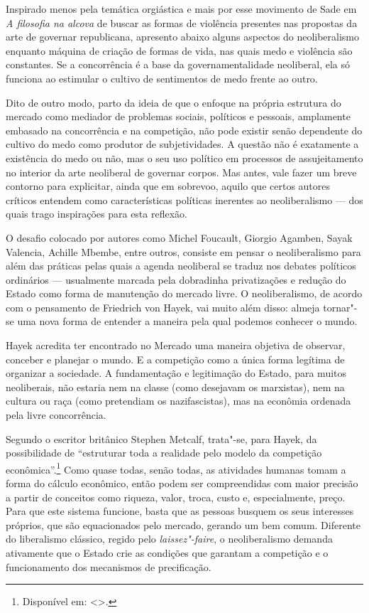 \asterisc

Inspirado menos pela temática orgiástica e mais por esse movimento de
Sade em \emph{A filosofia na alcova} de buscar as formas de violência
presentes nas propostas da arte de governar republicana, apresento
abaixo alguns aspectos do neoliberalismo enquanto máquina de criação de
formas de vida, nas quais medo e violência são constantes. Se a
concorrência é a base da governamentalidade neoliberal, ela só funciona
ao estimular o cultivo de sentimentos de medo frente ao outro.

Dito de outro modo, parto da ideia de
que o enfoque na própria estrutura do mercado como mediador de problemas
sociais, políticos e pessoais, amplamente embasado na concorrência e na
competição, não pode existir senão dependente do cultivo do medo como
produtor de subjetividades. A questão não é exatamente a existência do
medo ou não, mas o seu uso político em processos de assujeitamento no
interior da arte neoliberal de governar corpos. Mas antes, vale fazer um
breve contorno para explicitar, ainda que em sobrevoo, aquilo que certos autores críticos entendem como características políticas inerentes ao neoliberalismo --- dos quais trago inspirações para esta reflexão.

\asterisc

O desafio colocado por autores como Michel Foucault, Giorgio Agamben,
Sayak Valencia, Achille Mbembe, entre outros, consiste em pensar o
neoliberalismo para além das práticas pelas quais a agenda neoliberal se
traduz nos debates políticos ordinários --- usualmente marcada pela
dobradinha privatizações e redução do Estado como
forma de manutenção do mercado livre. O neoliberalismo, de acordo com o pensamento de Friedrich von
Hayek, vai muito além disso: almeja tornar"-se uma nova forma de entender
a maneira pela qual podemos conhecer o mundo.

Hayek acredita ter encontrado no Mercado uma maneira objetiva de observar, conceber e planejar o mundo. E a competição como a única forma legítima de organizar a sociedade. A fundamentação e
legitimação do Estado, para muitos neoliberais, não estaria nem na
classe (como desejavam os marxistas), nem na cultura ou raça (como
pretendiam os nazifascistas), mas na econômia ordenada pela livre
concorrência.

Segundo o escritor britânico Stephen Metcalf, trata"-se, para Hayek, da possibilidade de ``estruturar toda a realidade pelo modelo da competição
econômica''.\footnote{Disponível em: \textless{}{}\textgreater{}.}
Como quase todas, senão todas, as atividades humanas tomam a forma do
cálculo econômico, então podem ser compreendidas com maior precisão a
partir de conceitos como riqueza, valor, troca, custo e, especialmente,
preço. Para que este sistema funcione, basta que as pessoas busquem os
seus interesses próprios, que são equacionados pelo mercado, gerando um
bem comum. Diferente do liberalismo clássico, regido pelo \emph{laissez"-faire},
o neoliberalismo demanda ativamente que o Estado crie as condições que
garantam a competição e o funcionamento dos mecanismos de precificação.


